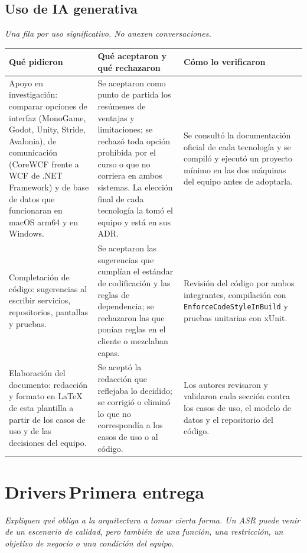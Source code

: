 \documentclass[11pt,letterpaper]{article}
\newcommand{\hint}[1]{{\itshape\color{black!70}#1}\par} %
\newcommand{\bluebadge}[1]{\hspace{0.8em}\colorbox{SADBlueBg}{\scriptsize\bfseries\color{SADBlue}\,#1\,}}
\newcommand{\hd}[1]{\textbf{\small #1}}
\newcommand{\headrow}{\rowcolor{SADHead}}
\begin{document}
\subsection{Uso de IA generativa}
\hint{Una fila por uso significativo. No anexen conversaciones.}
\noindent\begin{tabularx}{\linewidth}{|Y|Y|Y|}\hline
  \headrow\hd{Qué pidieron} & \hd{Qué aceptaron y qué rechazaron} & \hd{Cómo lo verificaron}\\\hline
  Apoyo en investigación: comparar opciones de interfaz (MonoGame, Godot, Unity, Stride, Avalonia), de comunicación (CoreWCF frente a WCF de .NET Framework) y de base de datos que funcionaran en macOS arm64 y en Windows. & Se aceptaron como punto de partida los resúmenes de ventajas y limitaciones; se rechazó toda opción prohibida por el curso o que no corriera en ambos sistemas. La elección final de cada tecnología la tomó el equipo y está en sus ADR. & Se consultó la documentación oficial de cada tecnología y se compiló y ejecutó un proyecto mínimo en las dos máquinas del equipo antes de adoptarla.\\\hline
  Completación de código: sugerencias al escribir servicios, repositorios, pantallas y pruebas. & Se aceptaron las sugerencias que cumplían el estándar de codificación y las reglas de dependencia; se rechazaron las que ponían reglas en el cliente o mezclaban capas. & Revisión del código por ambos integrantes, compilación con \texttt{EnforceCodeStyleInBuild} y pruebas unitarias con xUnit.\\\hline
  Elaboración del documento: redacción y formato en LaTeX de esta plantilla a partir de los casos de uso y de las decisiones del equipo. & Se aceptó la redacción que reflejaba lo decidido; se corrigió o eliminó lo que no correspondía a los casos de uso o al código. & Los autores revisaron y validaron cada sección contra los casos de uso, el modelo de datos y el repositorio del código.\\\hline
\end{tabularx}

\section{Drivers\bluebadge{Primera entrega}}
\hint{Expliquen qué obliga a la arquitectura a tomar cierta forma. Un ASR puede venir de un escenario de calidad, pero también de una función, una restricción, un objetivo de negocio o una condición del equipo.}
\end{document}

